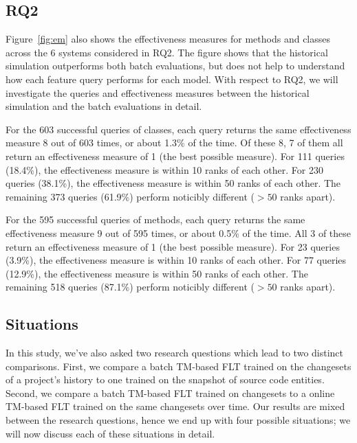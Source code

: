 \subsection{RQ2}

Figure~\ref{fig:em} also shows the effectiveness measures for methods and
classes across the 6 systems considered in RQ2. The figure shows that the
historical simulation outperforms both batch evaluations, but does not help to
understand how each feature query performs for each model.  With respect to RQ2,
we will investigate the queries and effectiveness measures between the
historical simulation and the batch evaluations in detail.

For the 603 successful queries of classes, each query returns the same
effectiveness measure 8 out of 603 times, or about 1.3\% of the time.  Of these
8, 7 of them all return an effectiveness measure of 1 (the best possible
measure).  For 111 queries (18.4\%), the effectiveness measure is within 10
ranks of each other.  For 230 queries (38.1\%), the effectiveness measure is
within 50 ranks of each other.  The remaining 373 queries (61.9\%) perform
noticibly different ($> 50$ ranks apart).

For the 595 successful queries of methods, each query returns the same
effectiveness measure 9 out of 595 times, or about 0.5\% of the time.  All 3 of
these return an effectiveness measure of 1 (the best possible measure).  For 23
queries (3.9\%), the effectiveness measure is within 10 ranks of each other.
For 77 queries (12.9\%), the effectiveness measure is within 50 ranks of each
other.  The remaining 518 queries (87.1\%) perform noticibly different ($> 50$
ranks apart).

\subsection{Situations}


In this study, we've also asked two research questions which lead to two
distinct comparisons.  First, we compare a batch TM-based FLT trained on the
changesets of a project's history to one trained on the snapshot of source code
entities.  Second, we compare a batch TM-based FLT trained on changesets to a
online TM-based FLT trained on the same changesets over time.  Our results are
mixed between the research questions, hence we end up with four possible
situations; we will now discuss each of these situations in detail.


